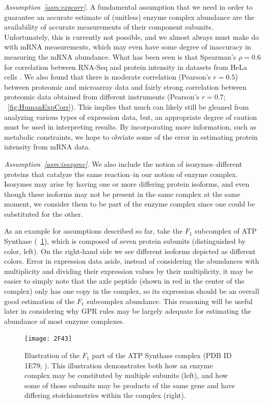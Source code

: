 \emph{Assumption~\ref{asm:expcorr}.}  A fundamental assumption
that we need in order to guarantee an accurate estimate of (unitless)
enzyme complex abundance are the availability of accurate measurements
of their component subunits. Unfortunately, this is currently not
possible, and we almost always must make do with mRNA measurements,
which may even have some degree of inaccuracy in measuring the mRNA
abundance. What has been seen is that Spearman's $\rho = 0.6$ for
correlation between RNA-Seq and protein intensity in datasets from
HeLa cells \citep{Nagaraj2011}. We also found that there is moderate
correlation (Pearson's $r = 0.5$) between proteomic and microarray data
and fairly strong correlation between proteomic data obtained from
different instruments 
(Pearson's $r = 0.7$; \suppOrApp \Fig~\ref{fig:HumanExpCorr}).
This implies that much can likely
still be gleaned from analyzing various types of expression data, 
but, an appropriate
degree of caution must be used in interpreting results. 
By incorporating more information, such as metabolic
constraints, we hope to obviate some of the error in estimating
protein intensity from mRNA data.

\emph{Assumption~\ref{asm:isozyme}.} We also include the notion of
isozymes--different proteins that catalyze the same reaction--in our
notion of enzyme complex. Isozymes may arise by having one or more
differing protein isoforms, and even though these isoforms may not be
present in the same complex at the same moment, we consider them to be
part of the enzyme complex since one could be substituted for the
other.

As an example for assumptions described so far, take the $F_1$
subcomplex of ATP Synthase (\Fig~\ref{fig:2F43}), which is composed
of seven protein subunits (distinguished by color, left). On the
right-hand side we see different isoforms depicted as different
colors.  Error in expression data aside, instead of considering the
abundances with multiplicity and dividing their expression values by
their multiplicity, it may be easier to simply note that the axle
peptide (shown in red in the center of the complex) only has one copy
in the complex, so its expression should be an overall good estimation
of the $F_1$ subcomplex abundance. This reasoning will be useful
later in considering why GPR rules may be largely adequate for estimating
the abundance of most enzyme complexes.

\begin{figure}%
\centering
\texttt{[image: 2F43]}
\caption{Illustration of the $F_1$ part of the ATP Synthase complex
  (PDB ID 1E79; \protect\citealt{Gibbons2000,Bernstein1978,Gezelter}).
  This illustration demonstrates both how an enzyme complex may be
  constituted by multiple subunits (left), and how some of those
  subunits may be products of the same gene and have differing
  stoichiometries within the complex (right).}
\label{fig:2F43}
\end{figure}

